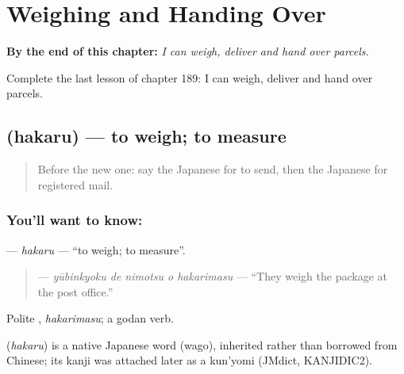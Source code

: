 
\chapter{Weighing and Handing Over}
\label{ch:ja-weighing-and-handing-over}

\begin{chapteropening}
\textbf{By the end of this chapter:} \emph{I can weigh, deliver and hand over parcels.}

Complete the last lesson of chapter 189: I can weigh, deliver and hand over parcels.
\end{chapteropening}

\section[\texorpdfstring{\ja{はかる} (hakaru)}{はかる (hakaru)}]{ (hakaru) — to weigh; to measure}

\label{lesson:JA-C189-hakaru}



\begin{quote}
Before the new one: say the Japanese for to send, then the Japanese for registered mail.
\end{quote}

\subsection*{You'll want to know: }
\textbf{} — \emph{hakaru} — \textquotedblleft{}to weigh; to measure\textquotedblright{}.

\begin{quote}
\textbf{  } — \emph{yūbinkyoku de nimotsu o hakarimasu} — \textquotedblleft{}They weigh the package at the post office.\textquotedblright{}
\end{quote}

Polite \textbf{}, \emph{hakarimasu}; a godan verb.

\begin{cousinweb}
\textbf{} (\emph{hakaru}) is a native Japanese word (wago), inherited rather than borrowed from Chinese; its kanji was attached later as a kun'yomi (JMdict, KANJIDIC2).
\end{cousinweb}

